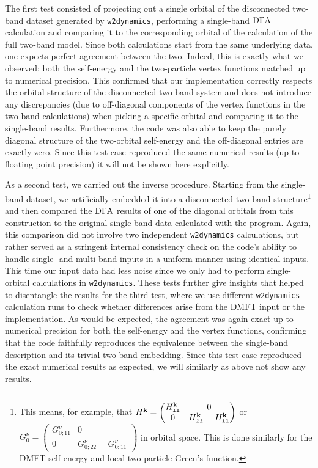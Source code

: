 \documentclass[../../main.tex]{subfiles}
\begin{document}
The first test consisted of projecting out a single orbital of the disconnected two-band dataset generated by \texttt{w2dynamics}, performing a single-band $\text{D}\Gamma\text{A}$ calculation and comparing it to the corresponding orbital of the calculation of the full two-band model. Since both calculations start from the same underlying data, one expects perfect agreement between the two. Indeed, this is exactly what we observed: both the self-energy and the two-particle vertex functions matched up to numerical precision. This confirmed that our implementation correctly respects the orbital structure of the disconnected two-band system and does not introduce any discrepancies (due to off-diagonal components of the vertex functions in the two-band calculations) when picking a specific orbital and comparing it to the single-band results. Furthermore, the code was also able to keep the purely diagonal structure of the two-orbital self-energy and the off-diagonal entries are exactly zero. Since this test case reproduced the same numerical results (up to floating point precision) it will not be shown here explicitly.
\newline

As a second test, we carried out the inverse procedure. Starting from the single-band dataset, we artificially embedded it into a disconnected two-band structure\footnote{This means, for example, that $H^{\textbf{k}}=\begin{pmatrix}H_{\mathfrak{11}}^{\textbf{k}} & 0\\ 0& H_{\mathfrak{22}}^{\textbf{k}}=H_{\mathfrak{11}}^{\textbf{k}}\end{pmatrix}$ or $G_0^{\nu}=\begin{pmatrix}G_{0;\mathfrak{11}}^{\nu} & 0\\0 & G_{0;\mathfrak{22}}^{\nu}=G_{0;\mathfrak{11}}^{\nu}\end{pmatrix}$ in orbital space. This is done similarly for the DMFT self-energy and local two-particle Green's function.} and then compared the $\text{D}\Gamma\text{A}$ results of one of the diagonal orbitals from this construction to the original single-band data calculated with the program. Again, this comparison did not involve two independent \texttt{w2dynamics} calculations, but rather served as a stringent internal consistency check on the code's ability to handle single- and multi-band inputs in a uniform manner using identical inputs. This time our input data had less noise since we only had to perform single-orbital calculations in \texttt{w2dynamics}. These tests further give insights that helped to disentangle the results for the third test, where we use different \texttt{w2dynamics} calculation runs to check whether differences arise from the DMFT input or the implementation. As would be expected, the agreement was again exact up to numerical precision for both the self-energy and the vertex functions, confirming that the code faithfully reproduces the equivalence between the single-band description and its trivial two-band embedding. Since this test case reproduced the exact numerical results as expected, we will similarly as above not show any results.
\newline
\end{document}
